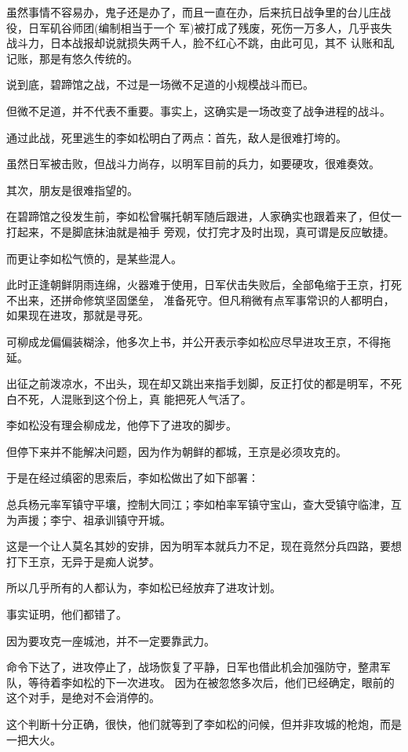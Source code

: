 \documentclass[11pt,a4paper,onecolumn]{article}
\begin{document}
虽然事情不容易办，鬼子还是办了，而且一直在办，后来抗日战争里的台儿庄战役，日军矶谷师团(编制相当于一个
军)被打成了残废，死伤一万多人，几乎丧失战斗力，日本战报却说就损失两千人，脸不红心不跳，由此可见，其不
认账和乱记账，那是有悠久传统的。

说到底，碧蹄馆之战，不过是一场微不足道的小规模战斗而已。

但微不足道，并不代表不重要。事实上，这确实是一场改变了战争进程的战斗。

通过此战，死里逃生的李如松明白了两点：首先，敌人是很难打垮的。

虽然日军被击败，但战斗力尚存，以明军目前的兵力，如要硬攻，很难奏效。

其次，朋友是很难指望的。

在碧蹄馆之役发生前，李如松曾嘱托朝军随后跟进，人家确实也跟着来了，但仗一打起来，不是脚底抹油就是袖手
旁观，仗打完才及时出现，真可谓是反应敏捷。

而更让李如松气愤的，是某些混人。

此时正逢朝鲜阴雨连绵，火器难于使用，日军伏击失败后，全部龟缩于王京，打死不出来，还拼命修筑坚固堡垒，
准备死守。但凡稍微有点军事常识的人都明白，如果现在进攻，那就是寻死。

可柳成龙偏偏装糊涂，他多次上书，并公开表示李如松应尽早进攻王京，不得拖延。

出征之前泼凉水，不出头，现在却又跳出来指手划脚，反正打仗的都是明军，不死白不死，人混账到这个份上，真
能把死人气活了。

李如松没有理会柳成龙，他停下了进攻的脚步。

但停下来并不能解决问题，因为作为朝鲜的都城，王京是必须攻克的。

于是在经过缜密的思索后，李如松做出了如下部署：

总兵杨元率军镇守平壤，控制大同江；李如柏率军镇守宝山，查大受镇守临津，互为声援；李宁、祖承训镇守开城。

这是一个让人莫名其妙的安排，因为明军本就兵力不足，现在竟然分兵四路，要想打下王京，无异于是痴人说梦。

所以几乎所有的人都认为，李如松已经放弃了进攻计划。

事实证明，他们都错了。

因为要攻克一座城池，并不一定要靠武力。

命令下达了，进攻停止了，战场恢复了平静，日军也借此机会加强防守，整肃军队，等待着李如松的下一次进攻。
因为在被忽悠多次后，他们已经确定，眼前的这个对手，是绝对不会消停的。

这个判断十分正确，很快，他们就等到了李如松的问候，但并非攻城的枪炮，而是一把大火。
\end{document}
